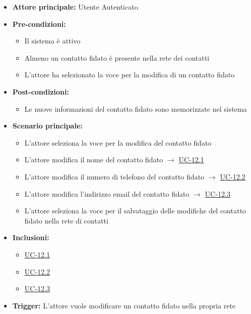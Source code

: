 \documentclass[a4paper,12pt]{article}
\begin{document}
\begin{itemize}
    \item \textbf{Attore principale:} Utente Autenticato
    \item \textbf{Pre-condizioni:} 
    \begin{itemize}
        \item Il sistema è attivo
        \item Almeno un contatto fidato è presente nella rete dei contatti
        \item L'attore ha selezionato la voce per la modifica di un contatto fidato
    \end{itemize}
    \item \textbf{Post-condizioni:}
    \begin{itemize}
        \item Le nuove informazioni del contatto fidato sono memorizzate nel sistema
    \end{itemize}
    \item \textbf{Scenario principale:} 
    \begin{itemize}
        \item L'attore seleziona la voce per la modifica del contatto fidato
        \item L'attore modifica il nome del contatto fidato $\rightarrow$ \hyperref[subsec:UC-12.1]{UC-12.1}
        \item L'attore modifica il numero di telefono del contatto fidato $\rightarrow$ \hyperref[subsec:UC-12.2]{UC-12.2}
        \item L'attore modifica l'indirizzo email del contatto fidato $\rightarrow$ \hyperref[subsec:UC-12.3]{UC-12.3}
        \item L'attore seleziona la voce per il salvataggio delle modifiche del contatto fidato nella rete di contatti
    \end{itemize}
    \item \textbf{Inclusioni:}
    \begin{itemize}
        \item \hyperref[subsec:UC-12.1]{UC-12.1}
        \item \hyperref[subsec:UC-12.2]{UC-12.2}
        \item \hyperref[subsec:UC-12.3]{UC-12.3}
    \end{itemize}
    \item \textbf{Trigger:} L'attore vuole modificare un contatto fidato nella propria rete
\end{itemize}
\end{document}
